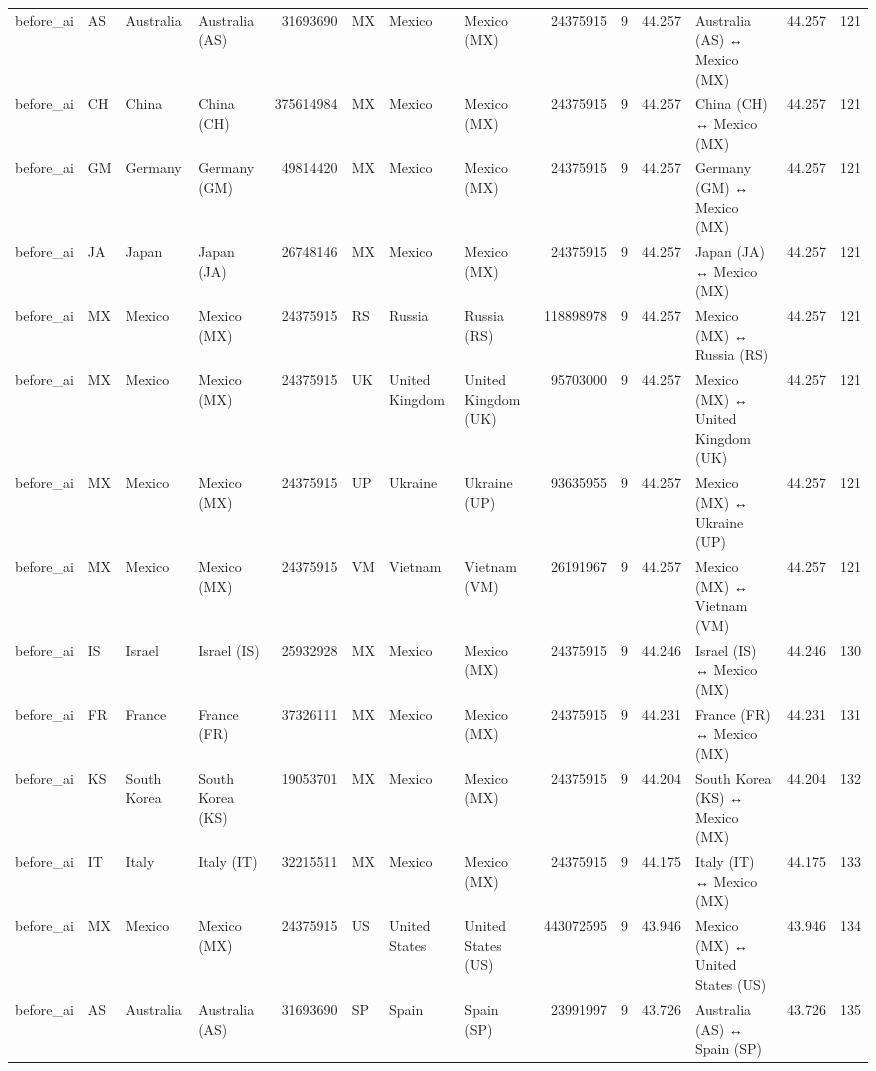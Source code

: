 \begin{tabular}{llllrlllrrrlrr}
before\_ai & AS & Australia & Australia (AS) & 31693690 & MX & Mexico & Mexico (MX) & 24375915 & 9 & 44.257 & Australia (AS) ↔ Mexico (MX) & 44.257 & 121 \\
before\_ai & CH & China & China (CH) & 375614984 & MX & Mexico & Mexico (MX) & 24375915 & 9 & 44.257 & China (CH) ↔ Mexico (MX) & 44.257 & 121 \\
before\_ai & GM & Germany & Germany (GM) & 49814420 & MX & Mexico & Mexico (MX) & 24375915 & 9 & 44.257 & Germany (GM) ↔ Mexico (MX) & 44.257 & 121 \\
before\_ai & JA & Japan & Japan (JA) & 26748146 & MX & Mexico & Mexico (MX) & 24375915 & 9 & 44.257 & Japan (JA) ↔ Mexico (MX) & 44.257 & 121 \\
before\_ai & MX & Mexico & Mexico (MX) & 24375915 & RS & Russia & Russia (RS) & 118898978 & 9 & 44.257 & Mexico (MX) ↔ Russia (RS) & 44.257 & 121 \\
before\_ai & MX & Mexico & Mexico (MX) & 24375915 & UK & United Kingdom & United Kingdom (UK) & 95703000 & 9 & 44.257 & Mexico (MX) ↔ United Kingdom (UK) & 44.257 & 121 \\
before\_ai & MX & Mexico & Mexico (MX) & 24375915 & UP & Ukraine & Ukraine (UP) & 93635955 & 9 & 44.257 & Mexico (MX) ↔ Ukraine (UP) & 44.257 & 121 \\
before\_ai & MX & Mexico & Mexico (MX) & 24375915 & VM & Vietnam & Vietnam (VM) & 26191967 & 9 & 44.257 & Mexico (MX) ↔ Vietnam (VM) & 44.257 & 121 \\
before\_ai & IS & Israel & Israel (IS) & 25932928 & MX & Mexico & Mexico (MX) & 24375915 & 9 & 44.246 & Israel (IS) ↔ Mexico (MX) & 44.246 & 130 \\
before\_ai & FR & France & France (FR) & 37326111 & MX & Mexico & Mexico (MX) & 24375915 & 9 & 44.231 & France (FR) ↔ Mexico (MX) & 44.231 & 131 \\
before\_ai & KS & South Korea & South Korea (KS) & 19053701 & MX & Mexico & Mexico (MX) & 24375915 & 9 & 44.204 & South Korea (KS) ↔ Mexico (MX) & 44.204 & 132 \\
before\_ai & IT & Italy & Italy (IT) & 32215511 & MX & Mexico & Mexico (MX) & 24375915 & 9 & 44.175 & Italy (IT) ↔ Mexico (MX) & 44.175 & 133 \\
before\_ai & MX & Mexico & Mexico (MX) & 24375915 & US & United States & United States (US) & 443072595 & 9 & 43.946 & Mexico (MX) ↔ United States (US) & 43.946 & 134 \\
before\_ai & AS & Australia & Australia (AS) & 31693690 & SP & Spain & Spain (SP) & 23991997 & 9 & 43.726 & Australia (AS) ↔ Spain (SP) & 43.726 & 135 \\

\end{tabular}
